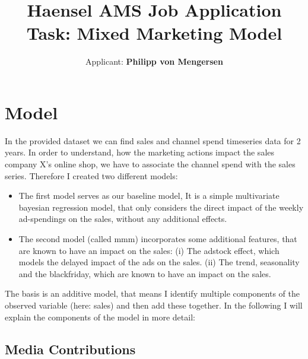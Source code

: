 \documentclass{article}
\title{Haensel AMS Job Application Task: Mixed Marketing Model}
\author{Applicant: \textbf{Philipp von Mengersen}}
\begin{document}
\maketitle

\small







\section{Model}
In the provided dataset we can find sales and channel spend timeseries data for 2 years. 
In order to understand, how the marketing actions impact the sales company X's online shop, we have to associate the channel spend with the sales series.
Therefore I created two different models:
\begin{itemize}
    \item  The first model serves as our baseline model, It is a simple multivariate bayesian regression model, 
    that only considers the direct impact of the weekly ad-spendings on the sales, without any additional effects.
    \item The second model (called mmm) incorporates some additional features, that are known to have an impact on the sales:
    (i) The adstock effect, which models the delayed impact of the ads on the sales.
    (ii) The trend, seasonality and the blackfriday, which are known to have an impact on the sales.
\end{itemize}

The basis is an additive model, that means I identify multiple components of the observed variable (here: sales) and then add these together.
In the following I will explain the components of the model in more detail:

\subsection{Media Contributions}
\end{document}
